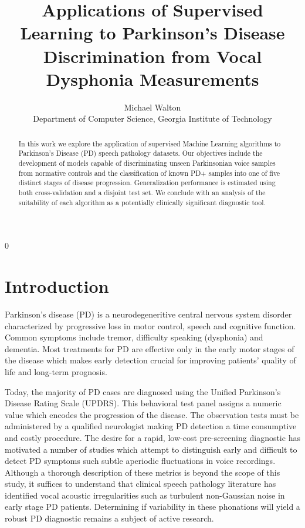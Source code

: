 \documentclass[12pt]{article}
\newcommand{\blind}{0}
\begin{document}
%

\def\spacingset#1{\renewcommand{\baselinestretch}%
{#1}\small\normalsize} \spacingset{1}



\blind
{
  \title{\bf Applications of Supervised Learning to Parkinson's Disease Discrimination from Vocal Dysphonia Measurements}
  \author{Michael Walton\\
    Department of Computer Science, Georgia Institute of Technology\\}
  \maketitle
} \fi



\begin{abstract}
In this work we explore the application of supervised Machine Learning algorithms to Parkinson's Disease (PD) speech pathology datasets. Our objectives include the development of models capable of discriminating unseen Parkinsonian voice samples from normative controls and the classification of known PD+ samples into one of five distinct stages of disease progression. Generalization performance is estimated using both cross-validation and a disjoint test set. We conclude with an analysis of the suitability of each algorithm as a potentially clinically significant diagnostic tool.
\end{abstract}

\spacingset{1.45}
\section{Introduction}
\label{sec:intro}

Parkinson's disease (PD) is a neurodegeneritive central nervous system disorder characterized by progressive loss in motor control, speech and cognitive function. Common symptoms include tremor, difficulty speaking (dysphonia) and dementia. Most treatments for PD are effective only in the early motor stages of the disease which makes early detection crucial for improving patients' quality of life and long-term prognosis.

Today, the majority of PD cases are diagnosed using the Unified Parkinson's Disease Rating Scale (UPDRS). This behavioral test panel assigns a numeric value which encodes the progression of the disease. The observation tests must be administered by a qualified neurologist making PD detection a time consumptive and costly procedure. The desire for a rapid, low-cost pre-screening diagnostic has motivated a number of studies which attempt to distinguish early and difficult to detect PD symptoms such subtle aperiodic fluctuations in voice recordings. Although a thorough description of these metrics is beyond the scope of this study, it suffices to understand that clinical speech pathology literature has identified vocal acoustic irregularities such as turbulent non-Gaussian noise in early stage PD patients. Determining if variability in these phonations will yield a robust PD diagnostic remains a subject of active research.
\end{document}
